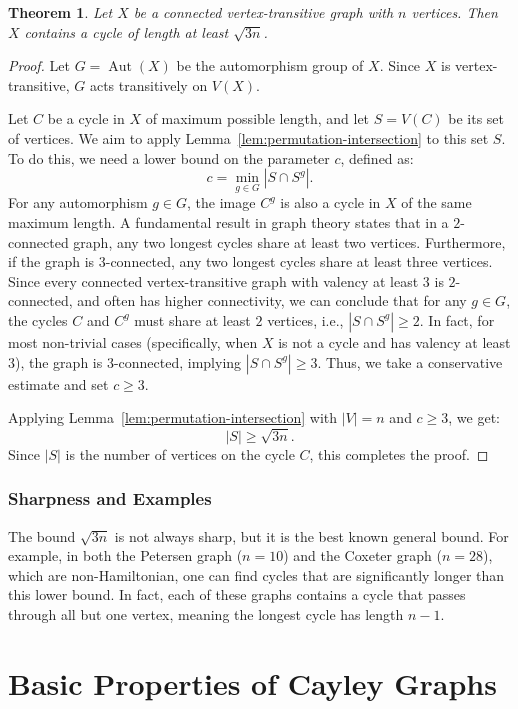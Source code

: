 \documentclass[12pt,a4paper,openany]{book}
\newtheorem{theorem}{Theorem}[section]
\begin{document}
\begin{theorem}\label{thm:cycle-lower-bound}
Let $X$ be a connected vertex-transitive graph with $n$ vertices. Then $X$ contains a cycle of length at least $\sqrt{3n}$.
\end{theorem}
\begin{proof}
Let $G = \operatorname{Aut}(X)$ be the automorphism group of $X$. Since $X$ is vertex-transitive, $G$ acts transitively on $V(X)$.

Let $C$ be a cycle in $X$ of maximum possible length, and let $S = V(C)$ be its set of vertices. We aim to apply Lemma~\ref{lem:permutation-intersection} to this set $S$. To do this, we need a lower bound on the parameter $c$, defined as:
\[
c = \min_{g \in G} |S \cap S^g|.
\]
For any automorphism $g \in G$, the image $C^g$ is also a cycle in $X$ of the same maximum length. A fundamental result in graph theory states that in a $2$-connected graph, any two longest cycles share at least two vertices. Furthermore, if the graph is $3$-connected, any two longest cycles share at least three vertices. Since every connected vertex-transitive graph with valency at least $3$ is $2$-connected, and often has higher connectivity, we can conclude that for any $g \in G$, the cycles $C$ and $C^g$ must share at least $2$ vertices, i.e., $|S \cap S^g| \ge 2$. In fact, for most non-trivial cases (specifically, when $X$ is not a cycle and has valency at least $3$), the graph is $3$-connected, implying $|S \cap S^g| \ge 3$. Thus, we take a conservative estimate and set $c \ge 3$.

Applying Lemma~\ref{lem:permutation-intersection} with $|V| = n$ and $c \ge 3$, we get:
\[
|S| \ge \sqrt{3n}.
\]
Since $|S|$ is the number of vertices on the cycle $C$, this completes the proof.
\end{proof}

\subsubsection*{Sharpness and Examples}

The bound $\sqrt{3n}$ is not always sharp, but it is the best known general bound. For example, in both the Petersen graph ($n=10$) and the Coxeter graph ($n=28$), which are non-Hamiltonian, one can find cycles that are significantly longer than this lower bound. In fact, each of these graphs contains a cycle that passes through all but one vertex, meaning the longest cycle has length $n-1$. 

\section{Basic Properties of Cayley Graphs}
\end{document}
